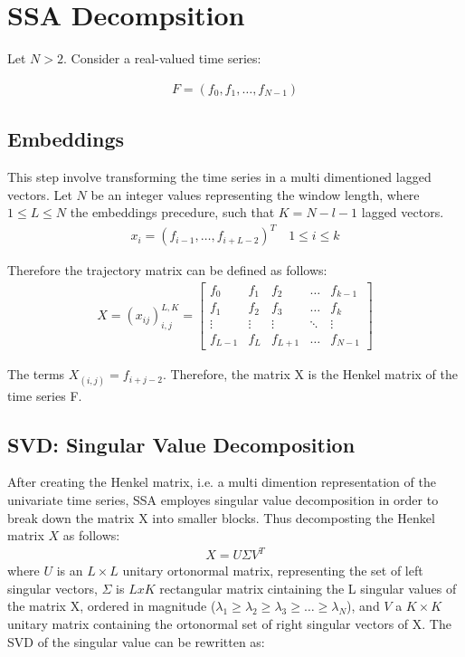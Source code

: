 \section{SSA Decompsition}
 
Let $N > 2$. Consider a real-valued time series: 

\begin{align}
	F = (f_0,f_1, \dots, f_{N-1})
\end{align}

\subsection{Embeddings}
This step involve transforming the time series in a multi dimentioned lagged vectors.
Let $N$ be an integer values representing the window length, where $1\leq L \leq N$
the embeddings precedure, such that $K = N-l-1$ lagged vectors. 
\begin{align}
	\nonumber x_i = (f_{i-1}, \dots , f_{i +L -2})^T \quad 1\leq i \leq k
\end{align} 

Therefore the trajectory matrix can be defined as follows:
\begin{align}
X = (x_{ij})_{i,j}^{L,K} = \begin{bmatrix} 
    f_0 & f_1 & f_2 & \dots & f_{k-1} \\
	f_1 & f_2 & f_3 & \dots & f_k \\
    \vdots & \vdots & \vdots & \ddots & \vdots \\
    f_{L-1} & f_L & f_{L+1} & \dots & f_{N-1}
    \end{bmatrix}
\end{align}

The terms $X_{(i,j)} = f_{i+j-2}$. Therefore, the matrix X is the Henkel matrix
of the time series F.  
\subsection{SVD: Singular Value Decomposition}
After creating the Henkel matrix, i.e. a multi dimention representation of the univariate time series, 
SSA employes singular value decomposition in order to break down the matrix X into smaller blocks. 
Thus decomposting the Henkel matrix $X$ as follows: 
\begin{align}
	X = U\Sigma V^T
\end{align}
where $U$ is an $L \times L$ unitary ortonormal matrix, representing the set of left singular vectors,  
 $\Sigma$ is $LxK$ rectangular matrix cintaining the L singular values of the matrix X,
ordered in magnitude ($\lambda_1 \geq \lambda_2 \geq \lambda_3 \geq\dots \geq \lambda_N $), and $V$ a $K \times K$
unitary matrix containing the ortonormal set of right singular vectors of X. 
The SVD of the singular value can be rewritten as:

